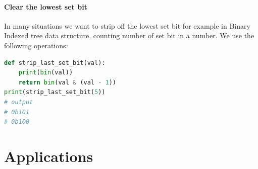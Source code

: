 \documentclass[../main.tex]{subfiles}
\begin{document}
\paragraph{Clear the lowest set bit} In many situations we want to strip off the lowest set bit for example in Binary Indexed tree data structure, counting number of set bit in a number. We use the following operations:
\begin{lstlisting}[language=Python]
def strip_last_set_bit(val):
    print(bin(val))
    return bin(val & (val - 1))
print(strip_last_set_bit(5))
# output
# 0b101
# 0b100
\end{lstlisting}




\section{Applications} 
\label{chapter_bit_section_bitwise}

\end{document}
